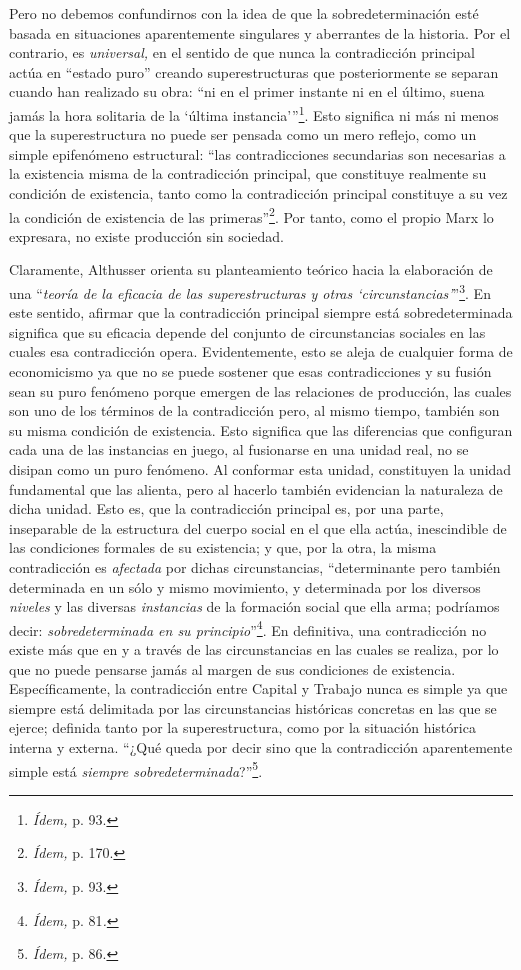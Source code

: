 Pero no debemos confundirnos con la idea de que la sobredeterminación esté basada en situaciones aparentemente singulares y aberrantes de la historia. Por el contrario, es \emph{universal,} en el sentido de que nunca la contradicción principal actúa en \enquote{estado puro} creando superestructuras que posteriormente se separan cuando han realizado su obra: \enquote{ni en el primer instante ni en el último, suena jamás la hora solitaria de la \enquote{última instancia}}\footnote{\emph{Ídem,} p. 93.}. Esto significa ni más ni menos que la superestructura no puede ser pensada como un mero reflejo, como un simple epifenómeno estructural: \enquote{las contradicciones secundarias son necesarias a la existencia misma de la contradicción principal, que constituye realmente su condición de existencia, tanto como la contradicción principal constituye a su vez la condición de existencia de las primeras}\footnote{\emph{Ídem,} p. 170.}. Por tanto, como el propio Marx lo expresara, no existe producción sin sociedad.

Claramente, Althusser orienta su planteamiento teórico hacia la elaboración de una \enquote{\emph{teoría de la eficacia de las superestructuras y otras \enquote{circunstancias}}}\footnote{\emph{Ídem,} p. 93.}. En este sentido, afirmar que la contradicción principal siempre está sobredeterminada significa que su eficacia depende del conjunto de circunstancias sociales en las cuales esa contradicción opera. Evidentemente, esto se aleja de cualquier forma de economicismo ya que no se puede sostener que esas contradicciones y su fusión sean su puro fenómeno porque emergen de las relaciones de producción, las cuales son uno de los términos de la contradicción pero, al mismo tiempo, también son su misma condición de existencia. Esto significa que las diferencias que configuran cada una de las instancias en juego, al fusionarse en una unidad real, no se disipan como un puro fenómeno. Al conformar esta unidad\emph{,} constituyen la unidad fundamental que las alienta, pero al hacerlo también evidencian la naturaleza de dicha unidad. Esto es, que la contradicción principal es, por una parte, inseparable de la estructura del cuerpo social en el que ella actúa, inescindible de las condiciones formales de su existencia; y que, por la otra, la misma contradicción es \emph{afectada} por dichas circunstancias, \enquote{determinante pero también determinada en un sólo y mismo movimiento, y determinada por los diversos \emph{niveles} y las diversas \emph{instancias} de la formación social que ella arma; podríamos decir: \emph{sobredeterminada en su principio}}\footnote{\emph{Ídem,} p. 81\emph{.}}. En definitiva, una contradicción no existe más que en y a través de las circunstancias en las cuales se realiza, por lo que no puede pensarse jamás al margen de sus condiciones de existencia. Específicamente, la contradicción entre Capital y Trabajo nunca es simple ya que siempre está delimitada por las circunstancias históricas concretas en las que se ejerce; definida tanto por la superestructura, como por la situación histórica interna y externa. \enquote{¿Qué queda por decir sino que la contradicción aparentemente simple está \emph{siempre sobredeterminada}?}\footnote{\emph{Ídem,} p. 86.}.

